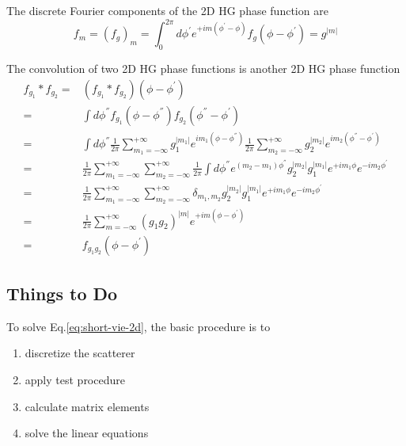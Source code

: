 \documentclass [10pt,letterpaper]{article}
\begin{document}
The discrete Fourier components of the 2D HG phase function are
\begin{equation} \label{eq:hg-phase-function-fm}
	f_m
	=
	(f_g)_m
	=
	\int_0^{2\pi}
	d\phi^\prime
	e^{+i m (\phi^\prime-\phi)}
	f_g(\phi-\phi^\prime)
	=g^{\lvert m \rvert}
\end{equation}

The convolution of two 2D HG phase functions is another 2D HG phase function
\begin{equation} \label{convolution-of-hg-phase-functions}
	\begin{split}
		f_{g_1}*f_{g_2}
		=&
		(f_{g_1}*f_{g_2})(\phi-\phi^\prime)
		\\
		=&
		\int d\phi^\second
		f_{g_1}(\phi-\phi^\second)
		f_{g_2}(\phi^\second-\phi^\prime)
		\\
		=&
		\int d\phi^\second
		\frac{1}{2\pi} 
		\sum\limits_{m_1=-\infty}^{+\infty}
		g_1^{\lvert m_1 \rvert}
		e^{i m_1 (\phi-\phi^\second)}
		\frac{1}{2\pi} 
		\sum\limits_{m_2=-\infty}^{+\infty}
		g_2^{\lvert m_2 \rvert}
		e^{i m_2 (\phi^\second-\phi^\prime)}
		\\
		=&
		\frac{1}{2\pi} 
		\sum\limits_{m_1=-\infty}^{+\infty}
		\sum\limits_{m_2=-\infty}^{+\infty}
		\frac{1}{2\pi} 
		\int d\phi^\second
		e^{(m_2-m_1)\phi^\second}
		g_2^{\lvert m_2 \rvert}
		g_1^{\lvert m_1 \rvert}
		e^{+i m_1 \phi}
		e^{-i m_2 \phi^\prime}
		\\
		=&
		\frac{1}{2\pi} 
		\sum\limits_{m_1=-\infty}^{+\infty}
		\sum\limits_{m_2=-\infty}^{+\infty}
		\delta_{m_1,m_2}
		g_2^{\lvert m_2 \rvert}
		g_1^{\lvert m_1 \rvert}
		e^{+i m_1 \phi}
		e^{-i m_2 \phi^\prime}
		\\
		=&
		\frac{1}{2\pi} 
		\sum\limits_{m=-\infty}^{+\infty}
		(g_1 g_2)^{\lvert m \rvert}
		e^{+i m (\phi-\phi^\prime)}
		\\
		=&
		f_{g_1 g_2}
		(\phi-\phi^\prime)
	\end{split}
\end{equation}
\subsection{Things to Do}
\label{sub:things-to-do}

To solve Eq.\eqref{eq:short-vie-2d}, the basic procedure is to
\begin{enumerate}
	\item discretize the scatterer
	\item apply test procedure
	\item calculate matrix elements
	\item solve the linear equations 
\end{enumerate}
\end{document}
